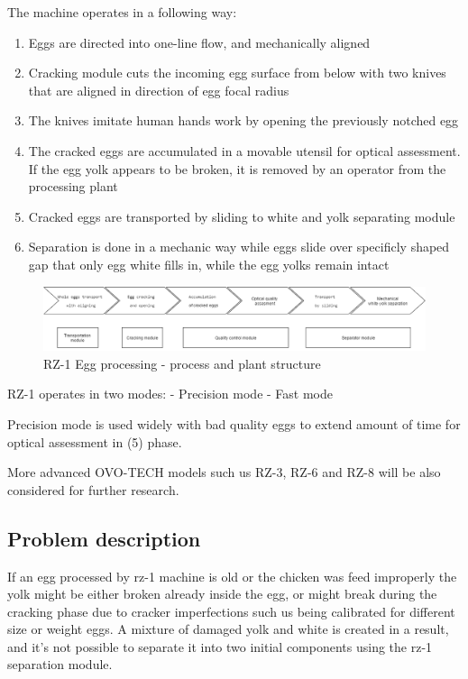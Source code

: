 \documentclass[12pt,twoside,a4paper]{article}
\begin{document}
The machine operates in a following way:
\begin{enumerate}
\item Eggs are directed into one-line flow, and mechanically aligned

\item Cracking module cuts the incoming egg surface from below with two knives that are aligned in direction of egg focal radius
\item The knives imitate human hands work by opening the previously notched egg
\item The cracked eggs are accumulated in a movable utensil for optical assessment. 
If the egg yolk appears to be broken, it is removed by an operator from the processing plant
\item Cracked eggs are transported by sliding to white and yolk separating module
\item Separation  is done in a mechanic way while eggs slide over specificly shaped gap that only egg white fills in, while the egg yolks remain intact
\end{enumerate}

\begin{figure}[H]
\centering
\includegraphics[width=0.8\paperwidth]{process}
\caption{RZ-1 Egg processing  - process and plant structure}

\end{figure}

RZ-1 operates in two modes:
- Precision mode
- Fast mode

Precision mode is used widely with bad quality eggs to extend amount of time for optical assessment in (5) phase.

More advanced OVO-TECH models such us RZ-3, RZ-6 and RZ-8 will be also considered for further research.

\subsection{Problem description}

If an egg processed by rz-1 machine is old or the chicken was feed improperly the yolk might be either broken already inside the egg, or might break during the cracking  phase due to cracker imperfections such us being calibrated for different size or weight eggs.
A mixture of damaged yolk and white is created in a result, and it’s not possible to separate it into two initial components using  the rz-1 separation  module.
\end{document}
